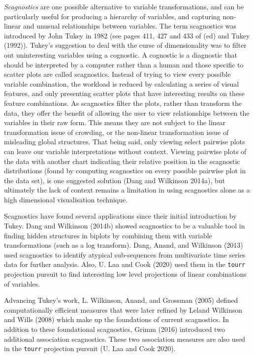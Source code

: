 \emph{Scagnostics} are one possible alternative to variable transformations, and can be particularly useful for producing a hierarchy of variables, and capturing non-linear and unusual relationships between variables. The term scagnostics was introduced by John Tukey in 1982 (see pages 411, 427 and 433 of (ed) and Tukey (1992)). Tukey's suggestion to deal with the curse of dimensionality was to filter out uninteresting variables using a cognostic. A cognostic is a diagnostic that should be interpreted by a computer rather than a human and those specific to scatter plots are called scagnostics. Instead of trying to view every possible variable combination, the workload is reduced by calculating a series of visual features, and only presenting scatter plots that have interesting results on these feature combinations. As scagnostics filter the plots, rather than transform the data, they offer the benefit of allowing the user to view relationships between the variables in their raw form. This means they are not subject to the linear transformation issue of crowding, or the non-linear transformation issue of misleading global structures. That being said, only viewing select pairwise plots can leave our variable interpretations without context. Viewing pairwise plots of the data with another chart indicating their relative position in the scagnostic distributions (found by computing scagnostics on every possible pairwise plot in the data set), is one suggested solution (Dang and Wilkinson 2014a), but ultimately the lack of context remains a limitation in using scagnostics alone as a high dimensional visualisation technique.

Scagnostics have found several applications since their initial introduction by Tukey. Dang and Wilkinson (2014b) showed scagnostics to be a valuable tool in finding hidden structures in biplots by combining them with variable transformations (such as a log transform). Dang, Anand, and Wilkinson (2013) used scagnostics to identify atypical sub-sequences from multivariate time series data for further analysis. Also, U. Laa and Cook (2020) used them in the \texttt{tourr} projection pursuit to find interesting low level projections of linear combinations of variables.

Advancing Tukey's work, L. Wilkinson, Anand, and Grossman (2005) defined computationally efficient measures that were later refined by Leland Wilkinson and Wills (2008) which make up the foundations of current scagnostics. In addition to these foundational scagnostics, Grimm (2016) introduced two additional association scagnostics. These two association measures are also used in the \texttt{tourr} projection pursuit (U. Laa and Cook 2020).


